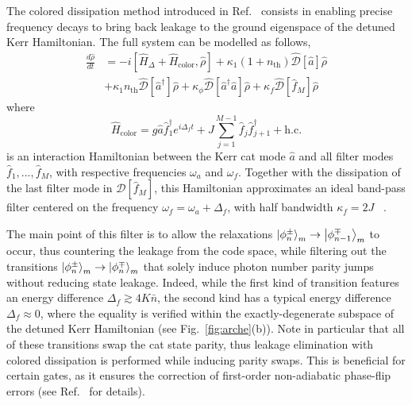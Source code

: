 \documentclass[%
 reprint,
 superscriptaddress,
 amsmath,
 amssymb,
 aps,
 pra,
 10pt
]{revtex4-2}
\newcommand{\hc}{\text{h.c.}} %
\newcommand{\nbar}{\bar{n}}
\newcommand{\adag}{\hat{a}^\dagger}
\newcommand{\hata}{\hat{a}}
\begin{document}
The colored dissipation method introduced in Ref.~\cite{Putterman2022} consists in enabling precise frequency decays to bring back leakage to the ground eigenspace of the detuned Kerr Hamiltonian. The full system can be modelled as follows,
\begin{equation}
    \begin{split}
        \frac{d \hat \rho}{dt} &= -i[\hat H_\Delta + \hat H_\text{color},\hat \rho] + \kappa_1(1+n_{\text{th}}) \mathcal{\hat D}[\hat a]\hat \rho \\ 
        & + \kappa_1 n_{\text{th}} \mathcal{\hat D}[\adag]\hat \rho + \kappa_\phi \mathcal{\hat D}[\adag \hata]\hat \rho + \kappa_f \mathcal{\hat D}[\hat f_M]\hat \rho
        \label{eq:color}
    \end{split}
\end{equation}
where
\begin{equation}
        \hat H_\text{color} = g \hat a \hat f_1^\dagger e^{i\Delta_f t} + J \sum_{j=1}^{M-1}\hat f_j \hat f_{j+1}^\dagger + \hc
\end{equation}
is an interaction Hamiltonian between the Kerr cat mode $\hata$ and all filter modes $\hat f_1,...,\hat f_{M}$, with respective frequencies $\omega_a$ and $\omega_f$. Together with the dissipation of the last filter mode in $\mathcal{D}[\hat{f}_M]$, this Hamiltonian approximates an ideal band-pass filter centered on the  frequency $\omega_f=\omega_a+\Delta_f$, with half bandwidth $\kappa_f = 2J$ ~\cite{Putterman2022}.

The main point of this filter is to allow the relaxations $\ket{\phi_n^\pm}_m \rightarrow \ket{\phi_{n-1}^\mp}_m$ to occur, thus countering the leakage from the code space, while filtering out the transitions $\ket{\phi_n^\pm}_m \rightarrow \ket{\phi_n^\mp}_m$ that solely induce photon number parity jumps without reducing state leakage. Indeed, while the first kind of transition features an energy difference $\Delta_f \gtrsim 4K \nbar$, the second kind has a typical energy difference $\Delta_f \approx 0$, where the equality is verified within the exactly-degenerate subspace of the detuned Kerr Hamiltonian (see Fig.~\ref{fig:arche}(b)). Note in particular that all of these transitions swap the cat state parity, thus leakage elimination with colored dissipation is performed while inducing parity swaps. This is beneficial for certain gates, as it ensures the correction of first-order non-adiabatic phase-flip errors (see Ref.~\cite{Putterman2022} for details).
\end{document}
